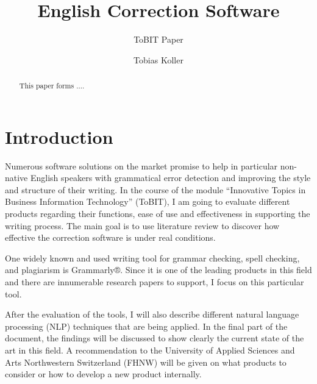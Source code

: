 \documentclass[runningheads]{llncs}
\let\OldTextregistered\textregistered
\renewcommand{\textregistered}{\OldTextregistered\xspace}%
\begin{document}
\title{English Correction Software}
\subtitle{ToBIT Paper}

\author{Tobias Koller}



\maketitle              %


\begin{abstract}
This paper forms ....

\end{abstract}



\section{Introduction}
Numerous software solutions on the market promise to help in particular non-native English speakers with grammatical error detection and improving the style and structure of their writing. In the course of the module ``Innovative Topics in Business Information Technology'' (ToBIT), I am going to evaluate different products regarding their functions, ease of use and effectiveness in supporting the writing process. The main goal is to use literature review to discover how effective the correction software is under real conditions.

One widely known and used writing tool for grammar checking, spell checking, and plagiarism is Grammarly\textregistered®. Since it is one of the leading products in this field and there are innumerable research papers to support, I focus on this particular tool.

After the evaluation of the tools, I will also describe different natural language processing (NLP) techniques that are being applied. In the final part of the document, the findings will be discussed to show clearly the current state of the art in this field. A recommendation to the University of Applied Sciences and Arts Northwestern Switzerland (FHNW) will be given on what products to consider or how to develop a new product internally.
\end{document}
